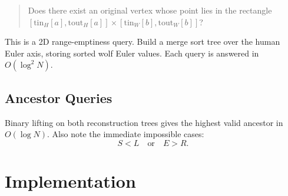 \documentclass[11pt,a4paper]{article}
\begin{document}
\begin{quote}
Does there exist an original vertex whose point lies in the rectangle
$[\mathrm{tin}_H[a], \mathrm{tout}_H[a]] \times [\mathrm{tin}_W[b], \mathrm{tout}_W[b]]$?
\end{quote}

This is a 2D range-emptiness query. Build a merge sort tree over the human Euler axis, storing sorted wolf Euler values. Each query is answered in $O(\log^2 N)$.

\subsection{Ancestor Queries}
Binary lifting on both reconstruction trees gives the highest valid ancestor in $O(\log N)$. Also note the immediate impossible cases:
\[
S < L \quad \text{or} \quad E > R.
\]

\section{Implementation}
\end{document}
